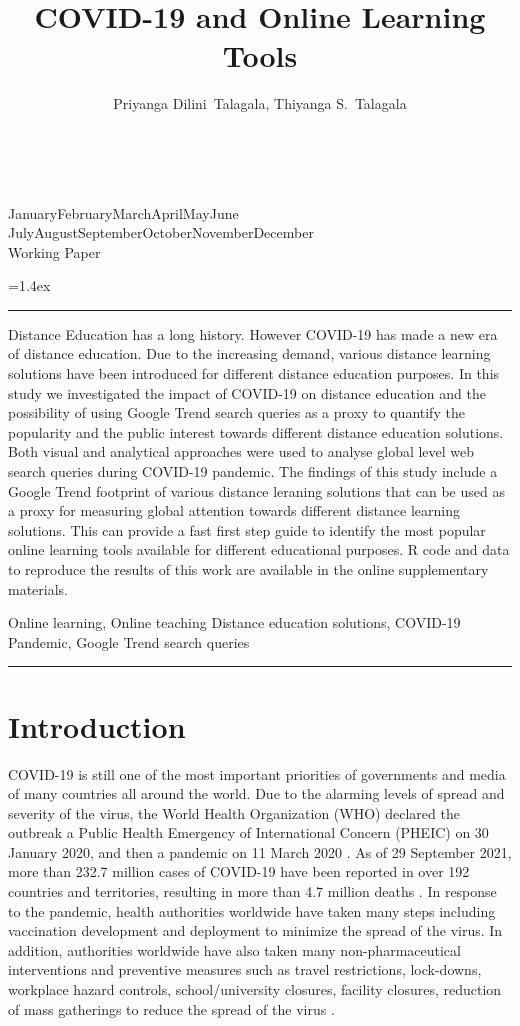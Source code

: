 \documentclass[11pt,a4paper,]{article}
\title{COVID-19 and Online Learning Tools}
\author{Priyanga Dilini~Talagala, Thiyanga S.~Talagala}
\date{\sf\Date~\Month~\Year}
\makeatletter
\def\Date{\number\day}
\def\Month{\ifcase\month\or
 January\or February\or March\or April\or May\or June\or
 July\or August\or September\or October\or November\or December\fi}
\def\Year{\number\year}
\def\showjel{{\large\textsf{\textbf{JEL classification:}}~\@jel}}
\def\cover{{\sffamily\setcounter{page}{0}
        \thispagestyle{empty}
        \vspace*{2cm}
        \begin{center}
        \fbox{\parbox{14cm}{\begin{onehalfspace}\centering\Huge\vspace*{0.3cm}
                \textsf{\textbf{\expandafter{\@title}}}\vspace{1cm}\par
                \LARGE\@author\end{onehalfspace}
        }}
        \end{center}
        \vfill
                \begin{center}\Large
                \Month~\Year\\[1cm]
                Working Paper \@wp
        \end{center}\vspace*{2cm}}}
\def\pageone{{\sffamily\setstretch{1}%
        \thispagestyle{empty}%
        \vbox to \textheight{%
        \raggedright\baselineskip=1.2cm
     {\fontsize{24.88}{30}\sffamily\textbf{\expandafter{\@title}}}
        \vspace{2cm}\par
        \hspace{1cm}\parbox{14cm}{\sffamily\large\@addresses}\vspace{1cm}\vfill
        \hspace{1cm}{\large\Date~\Month~\Year}\\[1cm]
        \hspace{1cm}\showjel\vss}}}
\def\blindtitle{{\sffamily
     \thispagestyle{plain}\raggedright\baselineskip=1.2cm
     {\fontsize{24.88}{30}\sffamily\textbf{\expandafter{\@title}}}\vspace{1cm}\par
        }}
\def\titlepage{{\cover\newpage\pageone\newpage\blindtitle}}
\let\maketitle\titlepage
\newenvironment{keywords}{\par\vspace{0.5cm}\noindent{\sffamily\textbf{Keywords:}}}{\vspace{0.25cm}\par\hrule\vspace{0.5cm}\par}
\renewenvironment{abstract}{\begin{minipage}{\textwidth}\parskip=1.4ex\noindent
\hrule\vspace{0.1cm}\par{\sffamily\textbf{\abstractname}}\newline}
  {\end{minipage}}
\makeatother
\begin{document}
\maketitle
\begin{abstract}
Distance Education has a long history. However COVID-19 has made a new era of distance education. Due to the increasing demand, various distance learning solutions have been introduced for different distance education purposes. In this study we investigated the impact of COVID-19 on distance education and the possibility of using Google Trend search queries as a proxy to quantify the popularity and the public interest towards different distance education solutions. Both visual and analytical approaches were used to analyse global level web search queries during COVID-19 pandemic. The findings of this study include a Google Trend footprint of various distance leraning solutions that can be used as a proxy for measuring global attention towards different distance learning solutions. This can provide a fast first step guide to identify the most popular online learning tools available for different educational purposes. R code and data to reproduce the results of this work are available in the online supplementary materials.
\end{abstract}
\begin{keywords}
Online learning, Online teaching Distance education solutions, COVID-19 Pandemic, Google Trend search queries
\end{keywords}

\hypertarget{introduction}{%
\section{Introduction}\label{introduction}}

COVID-19 is still one of the most important priorities of governments and media of many countries all around the world. Due to the alarming levels of spread and severity of the virus, the World Health Organization (WHO) declared the outbreak a Public Health Emergency of International Concern (PHEIC) on 30 January 2020, and then a pandemic on 11 March 2020 \autocite{world2020timeline}. As of 29 September 2021, more than 232.7 million cases of COVID-19 have been reported in over 192 countries and territories, resulting in more than 4.7 million deaths \autocite{dong2020interactive}. In response to the pandemic, health authorities worldwide have taken many steps including vaccination development and deployment to minimize the spread of the virus. In addition, authorities worldwide have also taken many non-pharmaceutical interventions and preventive measures such as travel restrictions, lock-downs, workplace hazard controls, school/university closures, facility closures, reduction of mass gatherings to reduce the spread of the virus \autocite{chang2020modelling}.
\end{document}
